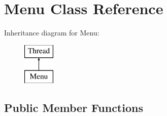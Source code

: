 \hypertarget{class_menu_1_1_menu}{}\section{Menu Class Reference}
\label{class_menu_1_1_menu}
Inheritance diagram for Menu\+:\begin{figure}[H]
\begin{center}
\leavevmode
\includegraphics[height=2.000000cm]{class_menu_1_1_menu}
\end{center}
\end{figure}
\subsection*{Public Member Functions}
